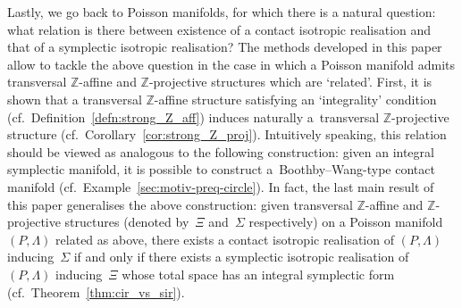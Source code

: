 \documentclass[pdftex]{sigma}
\numberwithin{equation}{section}
\newcommand{\PM}{(P,\Lambda)} %
\newcommand{\ZZ}{\mathbb{Z}}
\begin{document}
Lastly, we go back to Poisson manifolds, for which there is a natural question: what relation is there between existence of a contact isotropic realisation and that of a symplectic isotropic realisation? The methods developed in this paper allow to tackle the above question in the case in which a Poisson manifold admits transversal $\ZZ$-af\/f\/ine and $\ZZ$-projective structures which are `related'. First, it is shown that a transversal $\ZZ$-af\/f\/ine structure satisfying an `integrality' condition (cf.\ Def\/inition~\ref{defn:strong_Z_aff}) induces naturally a~transversal $\ZZ$-projective structure (cf.\ Corollary~\ref{cor:strong_Z_proj}). Intuitively speaking, this relation should be viewed as analogous to the following construction: given an integral symplectic manifold, it is possible to construct a~Boothby--Wang-type contact manifold (cf.\ Example~\ref{sec:motiv-preq-circle}). In fact, the last main result of this paper generalises the above construction: given transversal $\ZZ$-af\/f\/ine and $\ZZ$-projective structures (denoted by~$\Xi$ and~$\Sigma$ respectively) on a Poisson manifold $\PM$ related as above, there exists a contact isotropic reali\-sa\-tion of $\PM$ inducing~$\Sigma$ if and only if there exists a symplectic isotropic reali\-sa\-tion of~$\PM$ inducing~$\Xi$ whose total space has an integral symplectic form (cf.\ Theorem~\ref{thm:cir_vs_sir}).
\end{document}
